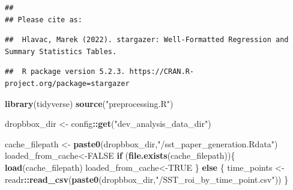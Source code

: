 \documentclass[
]{article}
\newenvironment{Shaded}{\begin{snugshade}}{\end{snugshade}}
\newcommand{\ControlFlowTok}[1]{\textcolor[rgb]{0.13,0.29,0.53}{\textbf{#1}}}
\newcommand{\KeywordTok}[1]{\textcolor[rgb]{0.13,0.29,0.53}{\textbf{#1}}}
\newcommand{\NormalTok}[1]{#1}
\newcommand{\OperatorTok}[1]{\textcolor[rgb]{0.81,0.36,0.00}{\textbf{#1}}}
\newcommand{\OtherTok}[1]{\textcolor[rgb]{0.56,0.35,0.01}{#1}}
\newcommand{\StringTok}[1]{\textcolor[rgb]{0.31,0.60,0.02}{#1}}
\begin{document}
\begin{verbatim}
## 
## Please cite as:
\end{verbatim}

\begin{verbatim}
##  Hlavac, Marek (2022). stargazer: Well-Formatted Regression and Summary Statistics Tables.
\end{verbatim}

\begin{verbatim}
##  R package version 5.2.3. https://CRAN.R-project.org/package=stargazer
\end{verbatim}

\begin{Shaded}
\begin{Highlighting}[]
\KeywordTok{library}\NormalTok{(tidyverse)}
\KeywordTok{source}\NormalTok{(}\StringTok{"preprocessing.R"}\NormalTok{)}
\end{Highlighting}
\end{Shaded}

\begin{Shaded}
\begin{Highlighting}[]
\NormalTok{dropbbox_dir <-}\StringTok{ }\NormalTok{config}\OperatorTok{::}\KeywordTok{get}\NormalTok{(}\StringTok{"dev_analysis_data_dir"}\NormalTok{)}
\end{Highlighting}
\end{Shaded}

\begin{Shaded}
\begin{Highlighting}[]
\NormalTok{cache_filepath <-}\StringTok{ }\KeywordTok{paste0}\NormalTok{(dropbbox_dir,}\StringTok{"/sst_paper_generation.Rdata"}\NormalTok{)}
\NormalTok{loaded_from_cache<-}\OtherTok{FALSE}
\ControlFlowTok{if}\NormalTok{ (}\KeywordTok{file.exists}\NormalTok{(cache_filepath))\{}
  \KeywordTok{load}\NormalTok{(cache_filepath)}
\NormalTok{  loaded_from_cache<-}\OtherTok{TRUE}
\NormalTok{\} }\ControlFlowTok{else}
\NormalTok{\{}
\NormalTok{  time_points <-}\StringTok{ }\NormalTok{readr}\OperatorTok{::}\KeywordTok{read_csv}\NormalTok{(}\KeywordTok{paste0}\NormalTok{(dropbbox_dir,}\StringTok{"/SST_roi_by_time_point.csv"}\NormalTok{))}
\NormalTok{\}}
\end{Highlighting}
\end{Shaded}
\end{document}
